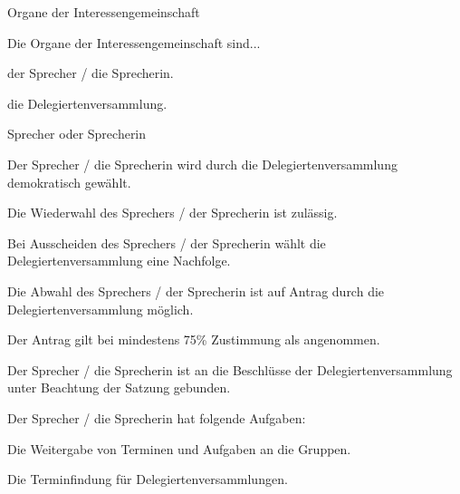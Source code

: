 \begin{legal}
    \item Organe der Interessengemeinschaft
        \begin{legal}
            \item Die Organe der Interessengemeinschaft sind...
                \begin{legal}
                    \item der Sprecher / die Sprecherin.
                    \item die Delegiertenversammlung.
                \end{legal}
        \end{legal}
    \item Sprecher oder Sprecherin
        \begin{legal}
            \item Der Sprecher / die Sprecherin wird durch die Delegiertenversammlung 
                  demokratisch gewählt.
            \item Die Wiederwahl des Sprechers / der Sprecherin ist zulässig.
            \item Bei Ausscheiden des Sprechers / der Sprecherin wählt die Delegiertenversammlung 
                  eine Nachfolge.
            \item Die Abwahl des Sprechers / der Sprecherin ist auf Antrag durch die 
                  Delegiertenversammlung möglich.
                \begin{legal}
                    \item Der Antrag gilt bei mindestens 75\% Zustimmung als angenommen.
                \end{legal}
            \item Der Sprecher / die Sprecherin ist an die Beschlüsse der Delegiertenversammlung 
                  unter Beachtung der Satzung gebunden.
            \item Der Sprecher / die Sprecherin hat folgende Aufgaben:
                  \begin{legal}
                        \item Die Weitergabe von Terminen und Aufgaben an die Gruppen.
                        \item Die Terminfindung für Delegiertenversammlungen.

\end{legal}
\end{legal}
\end{legal}
